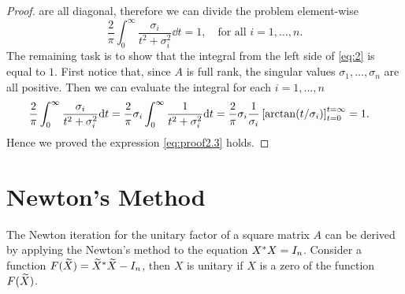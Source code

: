 \documentclass[12pt]{article}
\begin{document}
\begin{proof}
    are all diagonal, therefore we can divide the problem element-wise
    \begin{equation}
        \label{eq:2}
        \frac{2}{\pi}\int_0^\infty \frac{\sigma_i}{t^2 + \sigma_i^2} \dd t = 1,\quad \text{for all $i = 1,\dots,n$.}
    \end{equation}
    The remaining task is to show that the integral from the left side of \eqref{eq:2} is equal to $1$. First notice that, since $A$ is full rank, the singular values $\sigma_1, \dots, \sigma_n$ are all positive. Then we can evaluate the integral for each $i = 1,\dots,n$
    \begin{equation}
        \notag 
        \begin{aligned}
            \frac{2}{\pi}\int_0^\infty \frac{\sigma_i}{t^2 + \sigma_i^2} \mathrm{d} t & = \frac{2}{\pi} \sigma_i \int_0^\infty \frac{1}{t^2  + \sigma_i^2}\mathrm{d} t = \frac{2}{\pi}\sigma_i \frac{1}{\sigma_i} \left[\arctan(t/\sigma_i)\right]_{t = 0}^{t = \infty} = 1. 
        \end{aligned}
    \end{equation}
    Hence we proved the expression \eqref{eq:proof2.3} holds.
\end{proof}

\section{Newton's Method}

The Newton iteration for the unitary factor of a square matrix $A$ can be derived by applying the Newton's method to the equation $X^* X = I_n$. Consider a function $F(\widetilde X) = \widetilde X^* \widetilde X - I_n$, then $X$ is unitary if $X$ is a zero of the function $F(\widetilde X)$. 
\end{document}
